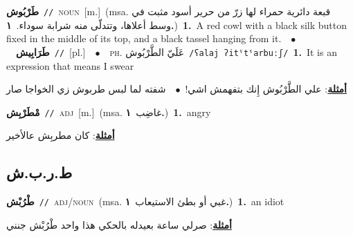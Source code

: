 \documentclass[10pt,a4paper,twoside]{article} %
\begin{document}
\begin{multicols}{2}
{\setlength\topsep{0pt}\textbf{\foreignlanguage{arabic}{طَرْبُوش}}\ {\color{gray}\texttt{//}\color{black}}\ \textsc{noun}\ [m.]\ \color{gray}(msa. \foreignlanguage{arabic}{قبعة دائرية حمراء لها زرّ من حرير أسود مثبت في وسط أعلاها، وتتدلّى منه شرابة سوداء.}~\foreignlanguage{arabic}{\textbf{١.}})\color{black}\ \textbf{1.}~A red cowl with a black silk button fixed in the middle of its top, and a black tassel hanging from it.\ \ $\bullet$\ \ \setlength\topsep{0pt}\textbf{\foreignlanguage{arabic}{طَرَابِيش}}\ {\color{gray}\texttt{//}\color{black}}\ [pl.]\ \ $\bullet$\ \ \textsc{ph.} \color{gray} \foreignlanguage{arabic}{عَلَيّ الطَّرْبُوش}\color{black}\ {\color{gray}\texttt{/{\sffamily ʕalaj ʔitˤtˤarbuːʃ}/}\color{black}}\ \textbf{1.}~It is an expression that means I swear\  \begin{flushright}\color{gray}\foreignlanguage{arabic}{\textbf{\underline{\foreignlanguage{arabic}{أمثلة}}}: علي الطَّرْبُوش إِنك بتفهمش اشي!\ $\bullet$\ \  شفته لما لبس طربوش زي الخواجا صار}\end{flushright}\color{black}} \vspace{2mm}

{\setlength\topsep{0pt}\textbf{\foreignlanguage{arabic}{مْطَرْبِش}}\ {\color{gray}\texttt{//}\color{black}}\ \textsc{adj}\ [m.]\ \color{gray}(msa. \foreignlanguage{arabic}{غاضِب}~\foreignlanguage{arabic}{\textbf{١.}})\color{black}\ \textbf{1.}~angry\  \begin{flushright}\color{gray}\foreignlanguage{arabic}{\textbf{\underline{\foreignlanguage{arabic}{أمثلة}}}: كان مطربِش عالأخير}\end{flushright}\color{black}} \vspace{2mm}

\vspace{-3mm}
\subsection*{\color{blue}\foreignlanguage{arabic}{ط.ر.ب.ش}\color{blue}{ (ntws)}} 

{\setlength\topsep{0pt}\textbf{\foreignlanguage{arabic}{طْرُبْش}}\ {\color{gray}\texttt{//}\color{black}}\ \textsc{adj/noun}\ \color{gray}(msa. \foreignlanguage{arabic}{غبي أو بطئ الاستيعاب}~\foreignlanguage{arabic}{\textbf{١.}})\color{black}\ \textbf{1.}~an idiot\  \begin{flushright}\color{gray}\foreignlanguage{arabic}{\textbf{\underline{\foreignlanguage{arabic}{أمثلة}}}: صرلي ساعة بعيدله بالحكي هذا واحد طْرُبْش جنني}\end{flushright}\color{black}} \vspace{2mm}


\end{multicols}
\end{document}
